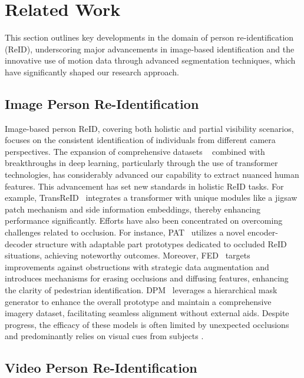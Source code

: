 \section{Related Work}
\label{sec:related}

This section outlines key developments in the domain of person re-identification (ReID), underscoring major advancements in image-based identification and the innovative use of motion data through advanced segmentation techniques, which have significantly shaped our research approach.

\subsection{Image Person Re-Identification}

Image-based person ReID, covering both holistic and partial visibility scenarios, focuses on the consistent identification of individuals from different camera perspectives. The expansion of comprehensive datasets ~\cite{BiCnet-TKS, tang2024mtvqa, shan2024mctbench, wang2024pargo,tang2024textsquare} combined with breakthroughs in deep learning, particularly through the use of transformer technologies, has considerably advanced our capability to extract nuanced human features. This advancement has set new standards in holistic ReID tasks. For example, TransReID~\cite{he2021transreid,liu2024rethink} integrates a transformer with unique modules like a jigsaw patch mechanism and side information embeddings, thereby enhancing performance significantly. Efforts have also been concentrated on overcoming challenges related to occlusion. For instance, PAT~\cite{li2021diverse} utilizes a novel encoder-decoder structure with adaptable part prototypes dedicated to occluded ReID situations, achieving noteworthy outcomes. Moreover, FED~\cite{wang2022feature} targets improvements against obstructions with strategic data augmentation and introduces mechanisms for erasing occlusions and diffusing features, enhancing the clarity of pedestrian identification. DPM~\cite{tan2022dynamic} leverages a hierarchical mask generator to enhance the overall prototype and maintain a comprehensive imagery dataset, facilitating seamless alignment without external aids. Despite progress, the efficacy of these models is often limited by unexpected occlusions and predominantly relies on visual cues from subjects \cite{wang2024pargo, sun2024attentive, lu2024bounding, zhao2024tabpedia}.

\subsection{Video Person Re-Identification}

